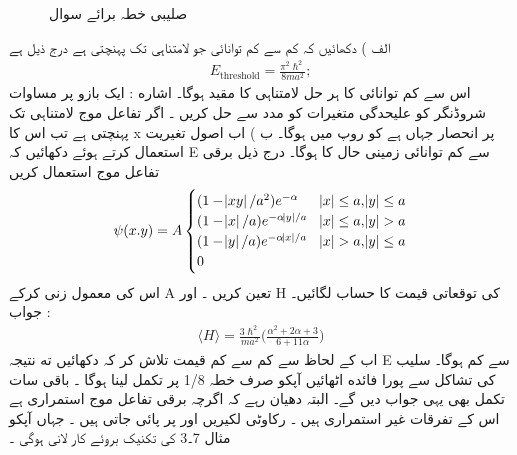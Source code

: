 \begin{figure} \centering
{} 
\caption{صلیبی خطہ برائے سوال } 
\label{شکل_تغیریت_صلیبی_خطہ} 
\end{figure} 
الف ) دکھائیں کہ کم سے کم توانائی جو لامتناہی تک پہنچتی ہے درج ذیل ہے
\begin{align}
E_{\text{threshold}}=\frac{\pi^{2}\hslash^{2}}{8ma^{2}};
\end{align}
 اس سے کم توانائی کا ہر حل لامتناہی کا مقید ہوگا۔
اشاره : ایک بازو پر  مساوات شروڈنگر کو علیحدگی متغیرات کو مدد سے حل کریں ۔ اگر تفاعل موج لامتناہی تک پہنچتی ہے تب اس کا x پر انحصار  جہاں  ہے کو روپ میں ہوگا۔
ب ) اب اصول تغیریت استعمال کرتے ہوئے دکھائیں کہ  E سے کم توانائی زمینی حال کا ہوگا۔ درج ذیل برقی تفاعل موج استعمال کریں 
\begin{align}
\psi(x.y)=A\begin{cases} (1-\abs{xy}/a^{2})e^{-\alpha} & \abs{x}\leq a,\abs{y}\leq a\\
(1-\abs{x}/a)e^{-\alpha\abs{y}/a} & \abs{x}\leq a ,\abs{y}> a\\
(1-\abs{y}/a)e^{-\alpha\abs{x}/a} & \abs{x}> a,\abs{y}\leq a\\
0\\
\end{cases} 
\end{align}
 اس کی  معمول زنی کرکے  A تعین کریں ۔ اور H کی توقعاتی قیمت کا حساب لگائیں۔
جواب :
\begin{align}
\langle H \rangle=\frac{3\hslash^{2}}{ma^{2}}\big (\frac{\alpha^{2}+2\alpha+3}{6+11\alpha}\big )
\end{align}
 اب  کے لحاظ سے کم سے کم قیمت تلاش کر کہ دکھائیں  ته نتیجہ  E سے کم ہوگا۔ سلیب کی تشاکل سے پورا  فائده   اٹھائیں آپکو صرف خطہ
1/8
پر تکمل لینا ہوگا ۔ باقی سات تکمل بھی یہی جواب دیں گے۔ البتہ  دھیان رہے کہ اگرچہ  برقی  تفاعل  موج استمراری ہے اس کے  تفرقات  غیر استمراری ہیں ۔ رکاوٹی لکیریں  اور  پر پائی  جاتی ہیں ۔ جہاں آپکو مثال 7۔3 کی تکنیک بروئے کار  لانی  ہوگی ۔
